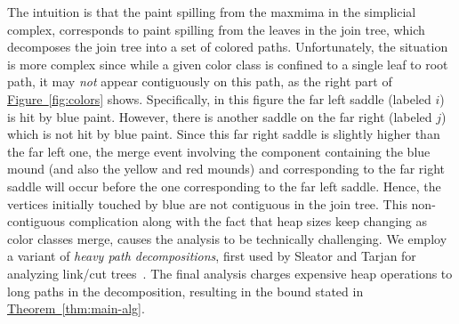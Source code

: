 \documentclass[11pt]{article}
\theoremstyle{definition}
\newcommand{\Fig}[1]{\hyperref[fig:#1]{Figure~\ref*{fig:#1}}} %
\newcommand{\Thm}[1]{\hyperref[thm:#1]{Theorem~\ref*{thm:#1}}} %
\begin{document}
The intuition is that the paint spilling from the maxmima in the simplicial complex, corresponds to paint spilling from the leaves in 
the join tree, which decomposes the join tree into a set of colored paths.  Unfortunately, the situation is more complex since 
while a given color class is confined to a single leaf to root path, it may \emph{not} appear contiguously on this path, as the right part of \Fig{colors} shows. 
Specifically, in this figure the far left saddle (labeled $i$) is hit by blue paint.  However, there is another 
saddle on the far right (labeled $j$) which is not hit by blue paint.  Since this far right saddle is slightly 
higher than the far left one, the merge event involving the component containing the blue mound (and also the yellow and red mounds) and corresponding to the far right saddle
will occur before the one corresponding to the far left saddle.  Hence, the vertices initially touched by blue are not contiguous in the join tree.
%
This non-contiguous complication along with the fact that heap sizes keep changing as color classes merge, causes the analysis to be technically challenging. 
We employ a variant of \emph{heavy path decompositions}, first used by Sleator and Tarjan for analyzing link/cut trees~\cite{st-dsdt-83}.
The final analysis charges expensive heap operations to long paths in the decomposition, resulting in the bound stated in \Thm{main-alg}.
 
 

\end{document}
